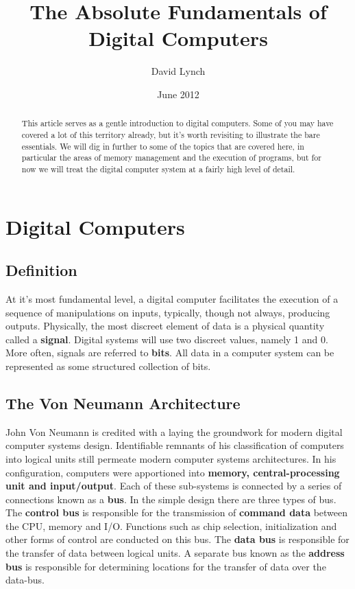 \documentclass[10pt,a4paper]{article}
\title{The Absolute Fundamentals of Digital Computers}
\author{David Lynch}
\date{June 2012}
\begin{document}
\maketitle
\begin{abstract}
This article serves as a gentle introduction to digital computers. Some of you may have covered a lot of this territory already, but it's worth revisiting to illustrate the bare essentials. We will dig in further to some of the topics that are covered here, in particular the areas of memory management and the execution of programs, but for now we will treat the digital computer system at a fairly high level of detail. 
\end{abstract}
\section{Digital Computers}
\subsection{Definition}
At it's most fundamental level, a digital computer facilitates the execution of a sequence of manipulations on inputs, typically, though not always, producing outputs. Physically, the most discreet element of data is a physical quantity called a {\bf signal}. Digital systems will use two discreet values, namely 1 and 0. More often, signals are referred to {\bf bits}. All data in a computer system can be represented as some structured collection of bits. 
\subsection{The Von Neumann Architecture}
John Von Neumann is credited with a laying the groundwork for modern digital computer systems design. Identifiable remnants of his classification of computers into logical units still permeate modern computer systems architectures. In his configuration, computers were apportioned into {\bf memory, central-processing unit and input/output}. Each of these sub-systems is connected by a series of connections known as a {\bf bus}. In the simple design there are three types of bus. The {\bf control bus} is responsible for the transmission of {\bf command data} between the CPU, memory and I/O. Functions such as chip selection, initialization and other forms of control are conducted on this bus. The {\bf data bus} is responsible for the transfer of data between logical units. A separate bus known as the {\bf address bus} is responsible for determining locations for the transfer of data over the data-bus. 
\end{document}
